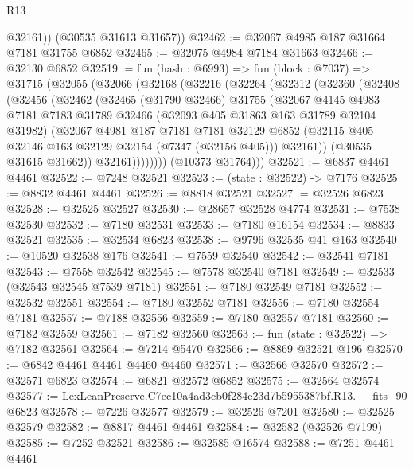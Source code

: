 \begin{lexlean}{R13}
\begin{coremodule}
          @32161))
      (@30535 @31613 @31657))
@32462 := @32067 @4985 @187 @31664 @7181 @31755 @6852
@32465 := @32075 @4984 @7184 @31663
@32466 := @32130 @6852
@32519 := fun (hash : @6993) =>
  fun (block : @7037) =>
  @31715
    (@32055
      (@32066
        (@32168
          (@32216
            (@32264
              (@32312
                (@32360
                  (@32408
                    (@32456
                      (@32462
                        (@32465
                          (@31790 @32466)
                          @31755
                          (@32067
                            @4145
                            @4983
                            @7181
                            @7183
                            @31789
                            @32466
                            (@32093 @405 @31863 @163 @31789 @32104 @31982)
                            (@32067
                              @4981
                              @187
                              @7181
                              @7181
                              @32129
                              @6852
                              (@32115 @405 @32146 @163 @32129 @32154 (@7347 (@32156 @405)))
                              @32161))
                          (@30535 @31615 @31662))
                        @32161))))))))
        (@10373 @31764)))
@32521 := @6837 @4461 @4461
@32522 := @7248 @32521
@32523 := (state : @32522) -> @7176
@32525 := @8832 @4461 @4461
@32526 := @8818 @32521
@32527 := @32526 @6823
@32528 := @32525 @32527
@32530 := @28657 @32528 @4774
@32531 := @7538 @32530
@32532 := @7180 @32531
@32533 := @7180 @16154
@32534 := @8833 @32521
@32535 := @32534 @6823
@32538 := @9796 @32535 @41 @163
@32540 := @10520 @32538 @176
@32541 := @7559 @32540
@32542 := @32541 @7181
@32543 := @7558 @32542
@32545 := @7578 @32540 @7181
@32549 := @32533 (@32543 @32545 @7539 @7181)
@32551 := @7180 @32549 @7181
@32552 := @32532 @32551
@32554 := @7180 @32552 @7181
@32556 := @7180 @32554 @7181
@32557 := @7188 @32556
@32559 := @7180 @32557 @7181
@32560 := @7182 @32559
@32561 := @7182 @32560
@32563 := fun (state : @32522) => @7182 @32561
@32564 := @7214 @5470
@32566 := @8869 @32521 @196
@32570 := @6842 @4461 @4461 @4460 @4460
@32571 := @32566 @32570
@32572 := @32571 @6823
@32574 := @6821 @32572 @6852
@32575 := @32564 @32574
@32577 := LexLeanPreserve.C7ec10a4ad3cb0f284e23d7b5955387bf.R13.__fits_90 @6823
@32578 := @7226 @32577
@32579 := @32526 @7201
@32580 := @32525 @32579
@32582 := @8817 @4461 @4461
@32584 := @32582 (@32526 @7199)
@32585 := @7252 @32521
@32586 := @32585 @16574
@32588 := @7251 @4461 @4461

\end{coremodule}
\end{lexlean}
